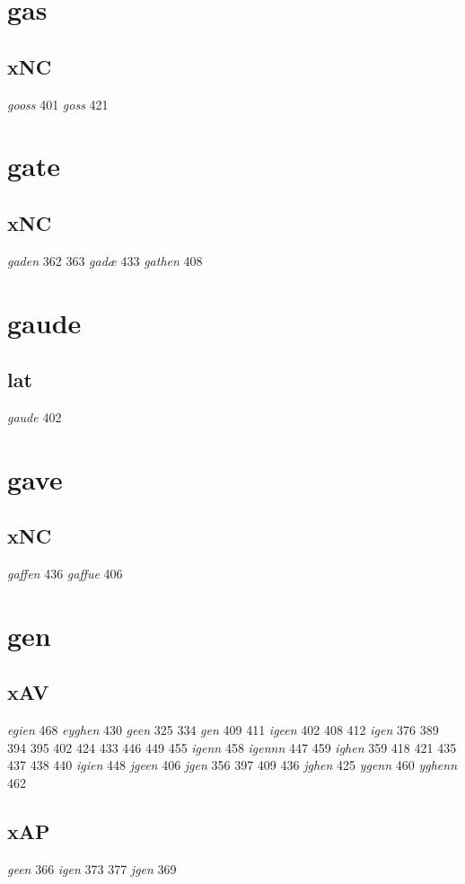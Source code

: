 \documentclass[a4paper,twocolumn]{article}
\begin{document}
\section{gas}
\label{sec:org17b6050}
\subsection{xNC}
\label{sec:orgc273763}
\emph{gooss} 401 \emph{goss} 421 
\section{gate}
\label{sec:orga374731}
\subsection{xNC}
\label{sec:org1e3f98f}
\emph{gaden} 362 363 \emph{gadæ} 433 \emph{gathen} 408 
\section{gaude}
\label{sec:org950a19a}
\subsection{lat}
\label{sec:orgcf89cbe}
\emph{gaude} 402 
\section{gave}
\label{sec:org83d825e}
\subsection{xNC}
\label{sec:org5247eb4}
\emph{gaffen} 436 \emph{gaffue} 406 
\section{gen}
\label{sec:orgb2158a7}
\subsection{xAV}
\label{sec:org7e316cb}
\emph{egien} 468 \emph{eyghen} 430 \emph{geen} 325 334 \emph{gen} 409 411 \emph{igeen} 402 408 412 \emph{igen} 376 389 394 395 402 424 433 446 449 455 \emph{igenn} 458 \emph{igennn} 447 459 \emph{ighen} 359 418 421 435 437 438 440 \emph{igien} 448 \emph{jgeen} 406 \emph{jgen} 356 397 409 436 \emph{jghen} 425 \emph{ygenn} 460 \emph{yghenn} 462 
\subsection{xAP}
\label{sec:org9183671}
\emph{geen} 366 \emph{igen} 373 377 \emph{jgen} 369 
\end{document}
